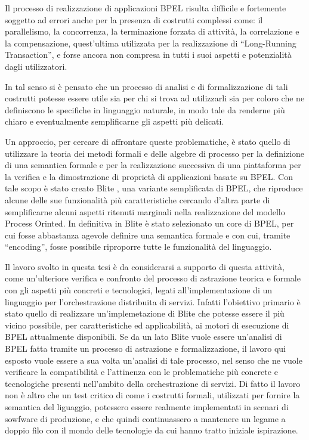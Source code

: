 Il processo di realizzazione di applicazioni BPEL
risulta difficile e fortemente soggetto ad errori anche per la presenza di
costrutti complessi come: il parallelismo, la concorrenza, la terminazione
forzata di attività, la correlazione e la compensazione, quest'ultima utilizzata
per la realizzazione di ``Long-Running Transaction'', e forse ancora non 
compresa in tutti i suoi aspetti e potenzialità dagli utilizzatori. 

In tal senso si è pensato che un processo di analisi e di formalizzazione di tali
costrutti potesse essere utile sia per chi si trova ad utilizzarli sia per coloro
che ne definiscono le specifiche in linguaggio naturale, in modo tale da renderne
più chiaro e eventualmente semplificarne gli aspetti più delicati.

Un approccio, per cercare di affrontare queste problematiche, è stato quello di
utilizzare la teoria dei metodi formali e delle algebre di processo per la
definizione di una semantica formale e per la realizzazione successiva di una
piattaforma per la verifica e la dimostrazione di proprietà di applicazioni
basate su BPEL. Con tale scopo è stato creato Blite \cite{LaPuTie1}, una variante
semplificata di BPEL, che riproduce alcune delle sue funzionalità più
caratteristiche cercando d'altra parte di semplificarne alcuni aspetti ritenuti
marginali nella realizzazione del modello Process Orinted. In definitiva in
Blite è stato selezionato un core di BPEL, per cui fosse abbastanza agevole
definire una semantica formale e con cui, tramite ``encoding'', fosse possibile riproporre
tutte le funzionalità del linguaggio.

Il lavoro svolto in questa tesi è da considerarsi a supporto di questa attività,
come un'ulteriore verifica e confronto del processo di astrazione teorica e
formale con gli aspetti più concreti e tecnologici, legati all'implementazione di
un linguaggio per l'orchestrazione distribuita di servizi. Infatti l'obiettivo
primario è stato quello di realizzare un'implemetazione di Blite che potesse
essere il più vicino possibile, per caratteristiche ed applicabilità, ai motori
di esecuzione di BPEL attualmente disponibili. Se da un lato Blite vuole essere
un'analisi di BPEL fatta tramite un processo di astrazione e formalizzazione, il
lavoro qui esposto vuole essere a sua volta un'analisi di tale processo, nel
senso che ne vuole verificare la compatibilità e l'attinenza con le problematiche
più concrete e tecnologiche presenti nell'ambito della orchestrazione di servizi.
Di fatto il lavoro non è altro che un test critico di come i costrutti formali,
utilizzati per fornire la semantica del liguaggio, potessero essere realmente
implementati in scenari di sowfware di produzione, e che quindi continuassero a
mantenere un legame a doppio filo con il mondo delle tecnologie da cui hanno
tratto iniziale ispirazione. 

